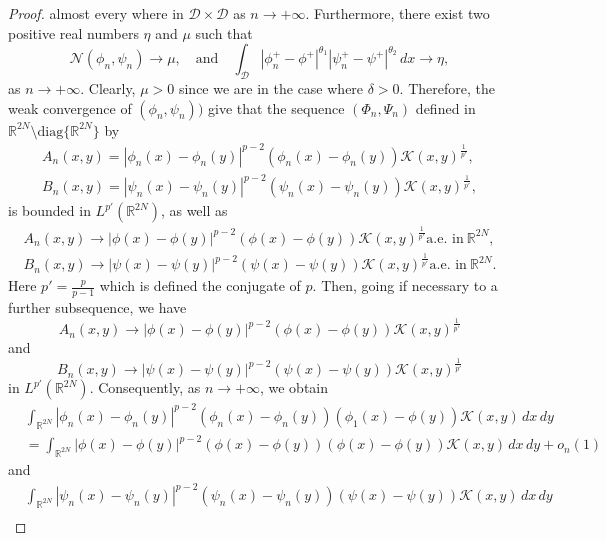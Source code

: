 \documentclass[10pt,a4paper]{amsart}
\numberwithin{equation}{section}
\begin{document}
\begin{proof}
almost every where in $\mathcal{D}\times\mathcal{D}$ as $n\to +\infty$. Furthermore,
there exist two positive real numbers $\eta$ and $\mu$ such that
\begin{equation}\label{K0}
\mathcal{N}(\phi_n,\psi_n)\to \mu,\quad \text{and}\quad
\int_\mathcal{D} |\phi^+_n-\phi^+|^{\theta_1}|\psi^+_n-\psi^+|^{\theta_2}\,dx\to \eta,
\end{equation}
as $n\to +\infty$. Clearly, $\mu>0$ since we are in the case where $\delta>0$.
Therefore, the weak convergence of $(\phi_n,\psi_n))$ give that the sequence
$(\Phi_n,\Psi_n)$ defined in
$\mathbb{R}^{2N}\setminus \text{diag}\lbrace \mathbb{R}^{2N}\rbrace$ by
\begin{gather*}
A_n(x,y)=|\phi_n(x)-\phi_n(y)|^{p-2}(\phi_n(x)-\phi_n(y))\mathcal{K}(x,y)^\frac{1}{p'},\\
B_n(x,y)=|\psi_n(x)-\psi_n(y)|^{p-2}(\psi_n(x)-\psi_n(y))\mathcal{K}(x,y)^\frac{1}{p'},
\end{gather*}
is bounded in $L^{p'}(\mathbb{R}^{2N})$, as well as
\begin{gather*}
A_n(x,y)\longrightarrow |\phi(x)-\phi(y)|^{p-2}(\phi(x)
-\phi(y))\mathcal{K}(x,y)^\frac{1}{p'} \text{a.e. in}\ \mathbb{R}^{2N}, \\
B_n(x,y)\longrightarrow |\psi(x)-\psi(y)|^{p-2}(\psi(x)
 -\psi(y))\mathcal{K}(x,y)^\frac{1}{p'} \text{a.e. in}\ \mathbb{R}^{2N}.
\end{gather*}
Here $p'=\frac{p}{p-1}$ which is defined the conjugate of $p$.
Then, going if necessary to a further subsequence, we have
$$
A_n(x,y)\longrightarrow |\phi(x)-\phi(y)|^{p-2}(\phi(x)-\phi(y))
\mathcal{K}(x,y)^\frac{1}{p'}
$$
and
$$
B_n(x,y)\longrightarrow |\psi(x)-\psi(y)|^{p-2}(\psi(x)-\psi(y))
\mathcal{K}(x,y)^\frac{1}{p'}
$$
in $L^{p'}(\mathbb{R}^{2N})$. Consequently, as $n\to +\infty$, we obtain
\begin{equation} \label{K1}
\begin{aligned}
&\int_{\mathbb{R}^{2N}}|\phi_n(x)-\phi_n(y)|^{p-2}(\phi_n(x)
 -\phi_n(y))(\phi_1(x)-\phi(y))\mathcal{K}(x,y)\,dx\,dy\\
&= \int_{\mathbb{R}^{2N}}|\phi(x)-\phi(y)|^{p-2}(\phi(x)-\phi(y))(\phi(x)
 -\phi(y))\mathcal{K}(x,y)\,dx\,dy+o_n(1)
\end{aligned}
\end{equation}
and
\begin{equation} \label{K2}
\begin{aligned}
&\int_{\mathbb{R}^{2N}}|\psi_n(x)-\psi_n(y)|^{p-2}(\psi_n(x)
 -\psi_n(y))(\psi(x)-\psi(y))\mathcal{K}(x,y)\,dx\,dy\\

\end{aligned}
\end{equation}
\end{proof}
\end{document}

